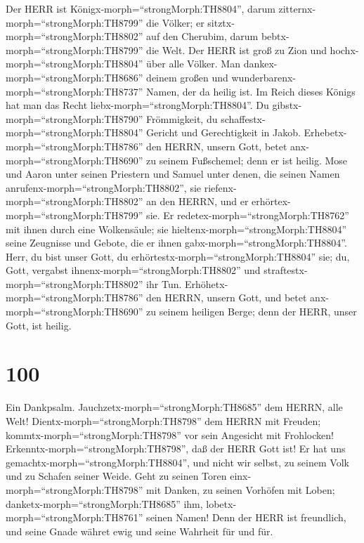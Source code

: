  Der HERR ist Königx-morph=``strongMorph:TH8804'', darum
zitternx-morph=``strongMorph:TH8799'' die Völker; er
sitztx-morph=``strongMorph:TH8802'' auf den Cherubim, darum
bebtx-morph=``strongMorph:TH8799'' die Welt.  Der HERR ist
groß zu Zion und hochx-morph=``strongMorph:TH8804'' über alle Völker.
 Man dankex-morph=``strongMorph:TH8686'' deinem großen und
wunderbarenx-morph=``strongMorph:TH8737'' Namen, der da heilig ist.
 Im Reich dieses Königs hat man das Recht
liebx-morph=``strongMorph:TH8804''. Du
gibstx-morph=``strongMorph:TH8790'' Frömmigkeit, du
schaffestx-morph=``strongMorph:TH8804'' Gericht und Gerechtigkeit in
Jakob.  Erhebetx-morph=``strongMorph:TH8786'' den HERRN,
unsern Gott, betet anx-morph=``strongMorph:TH8690'' zu seinem
Fußschemel; denn er ist heilig.  Mose und Aaron unter seinen
Priestern und Samuel unter denen, die seinen Namen
anrufenx-morph=``strongMorph:TH8802'', sie
riefenx-morph=``strongMorph:TH8802'' an den HERRN, und er
erhörtex-morph=``strongMorph:TH8799'' sie.  Er
redetex-morph=``strongMorph:TH8762'' mit ihnen durch eine Wolkensäule;
sie hieltenx-morph=``strongMorph:TH8804'' seine Zeugnisse und Gebote,
die er ihnen gabx-morph=``strongMorph:TH8804''.  Herr, du
bist unser Gott, du erhörtestx-morph=``strongMorph:TH8804'' sie; du,
Gott, vergabst ihnenx-morph=``strongMorph:TH8802'' und
straftestx-morph=``strongMorph:TH8802'' ihr Tun. 
Erhöhetx-morph=``strongMorph:TH8786'' den HERRN, unsern Gott, und betet
anx-morph=``strongMorph:TH8690'' zu seinem heiligen Berge; denn der
HERR, unser Gott, ist heilig.

\hypertarget{section-99}{%
\section{100}\label{section-99}}

 Ein Dankpsalm. Jauchzetx-morph=``strongMorph:TH8685'' dem
HERRN, alle Welt!  Dientx-morph=``strongMorph:TH8798'' dem
HERRN mit Freuden; kommtx-morph=``strongMorph:TH8798'' vor sein
Angesicht mit Frohlocken! 
Erkenntx-morph=``strongMorph:TH8798'', daß der HERR Gott ist! Er hat uns
gemachtx-morph=``strongMorph:TH8804'', und nicht wir selbst, zu seinem
Volk und zu Schafen seiner Weide.  Geht zu seinen Toren
einx-morph=``strongMorph:TH8798'' mit Danken, zu seinen Vorhöfen mit
Loben; danketx-morph=``strongMorph:TH8685'' ihm,
lobetx-morph=``strongMorph:TH8761'' seinen Namen!  Denn der
HERR ist freundlich, und seine Gnade währet ewig und seine Wahrheit für
und für.

